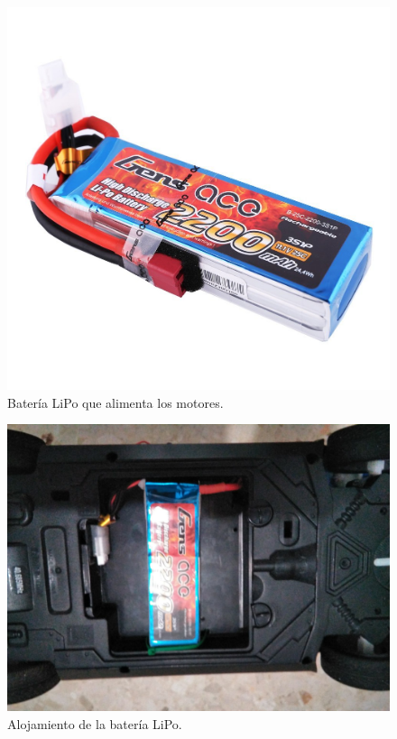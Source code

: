 \begin{figure}[H]
  \begin{center}
    \includegraphics[scale=0.15]{imagenes/robot/bateria.jpg}
  \end{center}
  \caption{Batería LiPo que alimenta los motores.}
  \label{figura:rpi-modulo-bateria}
\end{figure}


\begin{figure}[H]
  \begin{center}
    \includegraphics[scale=0.15]{imagenes/robot/alojamiento_bateria.jpg}
  \end{center}
  \caption{Alojamiento de la batería LiPo.}
  \label{figura:rpi-modulo-bateria}
\end{figure}



